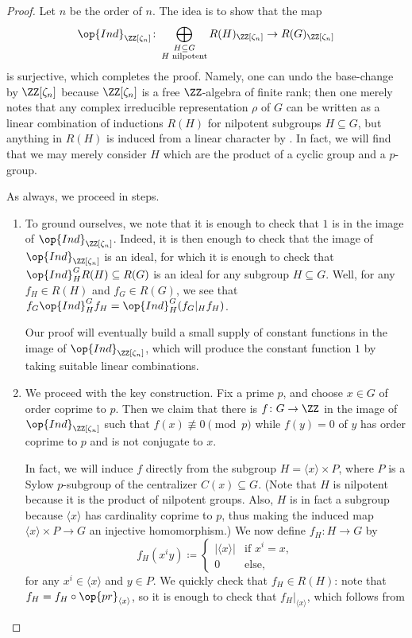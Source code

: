 \documentclass[../thesis.tex]{subfiles}
\begin{document}
\begin{proof}
	Let $n$ be the order of $n$. The idea is to show that the map
	\[\op{Ind}_{\ZZ[\zeta_n]}\colon\bigoplus_{\substack{H\subseteq G\\H\text{ nilpotent}}}R(H)_{\ZZ[\zeta_n]}\to R(G)_{\ZZ[\zeta_n]}\]
	is surjective, which completes the proof. Namely, one can undo the base-change by $\ZZ[\zeta_n]$ because $\ZZ[\zeta_n]$ is a free $\ZZ$-algebra of finite rank; then one merely notes that any complex irreducible representation $\rho$ of $G$ can be written as a linear combination of inductions $R(H)$ for nilpotent subgroups $H\subseteq G$, but anything in $R(H)$ is induced from a linear character by . In fact, we will find that we may merely consider $H$ which are the product of a cyclic group and a $p$-group.
	
	As always, we proceed in steps.
	\begin{enumerate}
		\item To ground ourselves, we note that it is enough to check that $1$ is in the image of $\op{Ind}_{\ZZ[\zeta_n]}$. Indeed, it is then enough to check that the image of $\op{Ind}_{\ZZ[\zeta_n]}$ is an ideal, for which it is enough to check that $\op{Ind}_H^GR(H)\subseteq R(G)$ is an ideal for any subgroup $H\subseteq G$. Well, for any $f_H\in R(H)$ and $f_G\in R(G)$, we see that $f_G\op{Ind}_H^Gf_H=\op{Ind}_H^G(f_G|_Hf_H)$.

		Our proof will eventually build a small supply of constant functions in the image of $\op{Ind}_{\ZZ[\zeta_n]}$, which will produce the constant function $1$ by taking suitable linear combinations.

		\item We proceed with the key construction. Fix a prime $p$, and choose $x\in G$ of order coprime to $p$. Then we claim that there is $f\colon G\to\ZZ$ in the image of $\op{Ind}_{\ZZ[\zeta_n]}$ such that $f(x)\not\equiv0\pmod p$ while $f(y)=0$ of $y$ has order coprime to $p$ and is not conjugate to $x$.

		In fact, we will induce $f$ directly from the subgroup $H=\langle x\rangle\times P$, where $P$ is a Sylow $p$-subgroup of the centralizer $C(x)\subseteq G$. (Note that $H$ is nilpotent because it is the product of nilpotent groups. Also, $H$ is in fact a subgroup because $\langle x\rangle$ has cardinality coprime to $p$, thus making the induced map $\langle x\rangle\times P\to G$ an injective homomorphism.) We now define $f_H\colon H\to G$ by
		\[f_H\left(x^iy\right)\coloneqq\begin{cases}
			\left|\langle x\rangle\right| & \text{if }x^i=x, \\
			0 & \text{else},
		\end{cases}\]
		for any $x^i\in\langle x\rangle$ and $y\in P$. We quickly check that $f_H\in R(H)$: note that $f_H=f_H\circ\op{pr}_{\langle x\rangle}$, so it is enough to check that $f_H|_{\langle x\rangle}$, which follows from 
		

\end{enumerate}
\end{proof}
\end{document}
